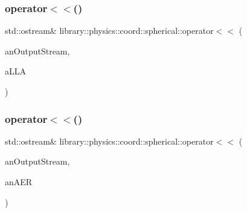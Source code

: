 \subsubsection{\texorpdfstring{operator$<$$<$()}{operator<<()}\hspace{0.1cm}{\footnotesize\ttfamily [1/2]}}
{\footnotesize\ttfamily std\+::ostream\& library\+::physics\+::coord\+::spherical\+::operator$<$$<$ (\begin{DoxyParamCaption}\item[{std\+::ostream \&}]{an\+Output\+Stream,  }\item[{const \hyperlink{classlibrary_1_1physics_1_1coord_1_1spherical_1_1_l_l_a}{L\+LA} \&}]{a\+L\+LA }\end{DoxyParamCaption})}

\mbox{\label{namespacelibrary_1_1physics_1_1coord_1_1spherical_a329c02f24427c714fd34c3ea372f7c95}} 
\subsubsection{\texorpdfstring{operator$<$$<$()}{operator<<()}\hspace{0.1cm}{\footnotesize\ttfamily [2/2]}}
{\footnotesize\ttfamily std\+::ostream\& library\+::physics\+::coord\+::spherical\+::operator$<$$<$ (\begin{DoxyParamCaption}\item[{std\+::ostream \&}]{an\+Output\+Stream,  }\item[{const \hyperlink{classlibrary_1_1physics_1_1coord_1_1spherical_1_1_a_e_r}{A\+ER} \&}]{an\+A\+ER }\end{DoxyParamCaption})}

